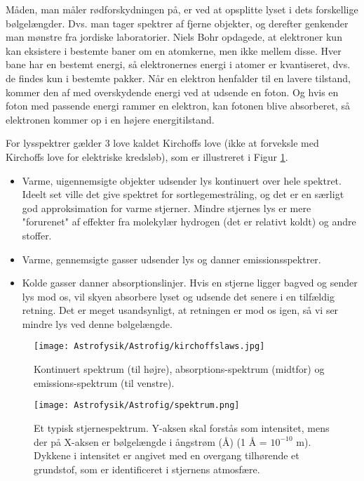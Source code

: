 Måden, man måler rødforskydningen på, er ved at opsplitte lyset i dets forskellige bølgelængder. Dvs. man tager spektrer af fjerne objekter, og derefter genkender man mønstre fra jordiske laboratorier. Niels Bohr opdagede, at elektroner kun kan eksistere i bestemte baner om en atomkerne, men ikke mellem disse. Hver bane har en bestemt energi, så elektronernes energi i atomer er kvantiseret, dvs. de findes kun i bestemte pakker. Når en elektron henfalder til en lavere tilstand, kommer den af med overskydende energi ved at udsende en foton. Og hvis en foton med passende energi rammer en elektron, kan fotonen blive absorberet, så elektronen kommer op i en højere energitilstand. 

For lysspektrer gælder 3 love kaldet Kirchoffs love (ikke at forveksle med Kirchoffs love for elektriske kredsløb), som er illustreret i Figur \ref{kirchoff}.
\begin{itemize}
	\item Varme, uigennemsigte objekter udsender lys kontinuert over hele spektret. Ideelt set ville det give spektret for sortlegemestråling, og det er en særligt god approksimation for varme stjerner. Mindre stjernes lys er mere "forurenet" af effekter fra molekylær hydrogen (det er relativt koldt) og andre stoffer.
	\item Varme, gennemsigte gasser udsender lys og danner emissionsspektrer.
	\item Kolde gasser danner absorptionslinjer. Hvis en stjerne ligger bagved og sender lys mod os, vil skyen absorbere lyset og udsende det senere i en tilfældig retning. Det er meget usandsynligt, at retningen er mod os igen, så vi ser mindre lys ved denne bølgelængde.
\end{itemize}

\begin{figure}[h]
	\centering
	\texttt{[image: Astrofysik/Astrofig/kirchoffslaws.jpg]}
	\caption{Kontinuert spektrum (til højre), absorptions-spektrum (midtfor) og
		emissions-spektrum (til venstre). }
	\label{kirchoff}
\end{figure}

\begin{figure}[h!]
	\centering
	\texttt{[image: Astrofysik/Astrofig/spektrum.png]}
	\caption{Et typisk stjernespektrum. Y-aksen skal forstås som intensitet, mens der
		på X-aksen er bølgelængde i ångstrøm (Å) (1 Å = $10^{-10}$ m). Dykkene i intensitet
		er angivet med en overgang tilhørende et grundstof, som er identificeret i stjernens
		atmosfære. }
	\label{spektrum} %
\end{figure}

